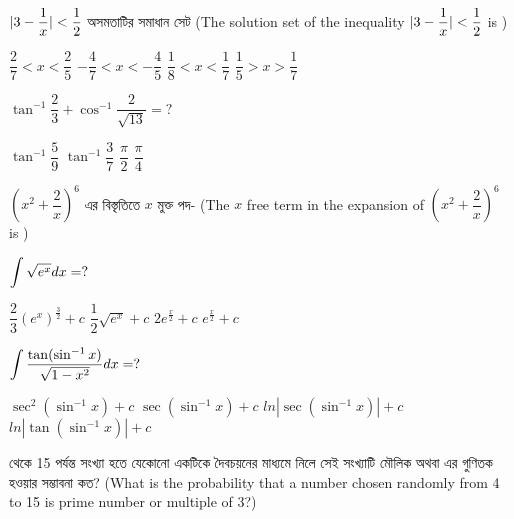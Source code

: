 \documentclass[addpoints]{exam}
\begin{document}
\begin{questions}
\question   $ \mathlarger{|3-\dfrac{1}{x}|<\dfrac{1}{2}} $ অসমতাটির সমাধান সেট (The solution set of the inequality $ \mathlarger{|3-\dfrac{1}{x}|<\dfrac{1}{2}} $ is )

\begin{oneparchoices}
\choice $ \dfrac{2}{7} < x < \dfrac{2}{5}$
\choice $ -\dfrac{4}{7} < x < -\dfrac{4}{5}$
\choice $ \dfrac{1}{8} < x < \dfrac{1}{7}$
\choice $ \dfrac{1}{5} > x > \dfrac{1}{7}$

\end{oneparchoices}

\question  $ \tan^{-1}\dfrac{2}{3} + \cos^{-1}\dfrac{2}{\sqrt{13}} = ?$

\begin{oneparchoices}
\choice $ \tan^{-1}\dfrac{5}{9} $ 
\choice $ \tan^{-1}\dfrac{3}{7} $ 
\choice $ \dfrac{\pi}{2} $ 
\choice $ \dfrac{\pi}{4} $ 

\end{oneparchoices}

\question  $ (x^{2} + \dfrac{2}{x})^{6} $ এর বিস্তৃতিতে $ x$ মুক্ত পদ- (The $ x $ free term in the expansion of $ (x^{2} + \dfrac{2}{x})^{6} $ is )

\begin{oneparchoices}

\end{oneparchoices}

\question  $ \mathlarger{\int\sqrt{e^{x}}dx} =? $

\begin{oneparchoices}
\choice $ \dfrac{2}{3}(e^x)^{\frac{3}{2}} + c$ 
\choice $ \dfrac{1}{2}\sqrt{e^x} + c $
\choice $ 2e^{\frac{x}{2}} + c $
\choice $ e^{\frac{x}{2}} + c $

\end{oneparchoices}

\question  $ \mathlarger{\int\dfrac{\tan(\sin^{-1}x)}{\sqrt{1-x^{2}}} dx} =? $

\begin{oneparchoices}
\choice $ \sec^{2}(\sin^{-1}x) + c$ 
\choice $ \sec(\sin^{-1}x) + c $ 
\choice $ ln|\sec(\sin^{-1}x)| + c $
\choice $ ln|\tan(\sin^{-1}x)| + c $

\end{oneparchoices}

 থেকে 15 পর্যন্ত সংখ্যা হতে যেকোনো একটিকে দৈবচয়নের মাধ্যমে নিলে সেই সংখ্যাটি মৌলিক অথবা এর গুণিতক হওয়ার সম্ভাবনা কত? (What is the probability that a number chosen randomly from 4 to 15 is prime number or multiple of 3?)


\end{questions}
\end{document}
